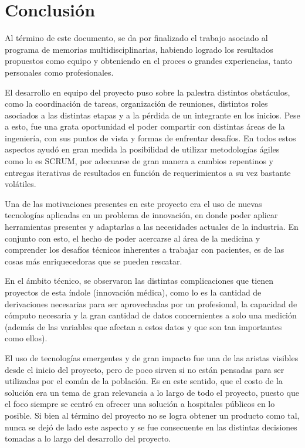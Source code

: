 \chapter{Conclusión}\label{conclusion}

Al término de este documento, se da por finalizado el trabajo asociado al programa de memorias multidisciplinarias, habiendo logrado los resultados propuestos como equipo y obteniendo en el proces o grandes experiencias, tanto personales como profesionales.

El desarrollo en equipo del proyecto puso sobre la palestra distintos obstáculos, como la coordinación de tareas, organización de reuniones, distintos roles asociados a las distintas etapas y a la pérdida de un integrante en los inicios. Pese a esto, fue una grata oportunidad el poder compartir con distintas áreas de la ingeniería, con sus puntos de vista y formas de enfrentar desafíos. En todos estos aspectos ayudó en gran medida la posibilidad de utilizar metodologías ágiles como lo es SCRUM, por adecuarse de gran manera a cambios repentinos y entregas iterativas de resultados en función de requerimientos a su vez bastante volátiles.

Una de las motivaciones presentes en este proyecto era el uso de nuevas tecnologías aplicadas en un problema de innovación, en donde poder aplicar herramientas presentes y adaptarlas a las necesidades actuales de la industria. En conjunto con esto, el hecho de poder acercarse al área de la medicina y comprender los desafíos técnicos inherentes a trabajar con pacientes, es de las cosas más enriquecedoras que se pueden rescatar.

En el ámbito técnico, se observaron las distintas complicaciones que tienen proyectos de esta índole (innovación médica), como lo es la cantidad de derivaciones necesarias para ser aprovechadas por un profesional, la capacidad de cómputo necesaria y la gran cantidad de datos concernientes a solo una medición (además de las variables que afectan a estos datos y que son tan importantes como ellos).

\newpage

El uso de tecnologías emergentes y de gran impacto fue una de las aristas visibles desde el inicio del proyecto, pero de poco sirven si no están pensadas para ser utilizadas por el común de la población. Es en este sentido, que el costo de la solución era un tema de gran relevancia a lo largo de todo el proyecto, puesto que el foco siempre se centró en ofrecer una solución a hospitales públicos en lo posible. Si bien al término del proyecto no se logra obtener un producto como tal, nunca se dejó de lado este aspecto y se fue consecuente en las distintas decisiones tomadas a lo largo del desarrollo del proyecto.

